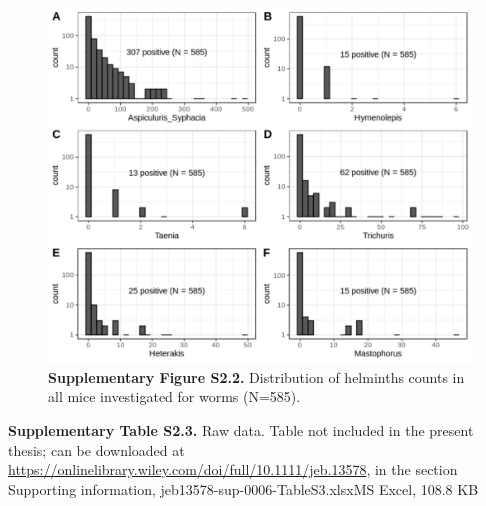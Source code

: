 \begin{figure}[H]
	\centering
	\includegraphics[width=\linewidth,height=\textheight,keepaspectratio]{images/2article1/SupplementaryFigureS2.pdf}
	\captionsetup{labelformat=empty}
	\caption{\textbf{Supplementary Figure S2.2.} Distribution of helminths counts in all mice investigated for worms (N=585).}
\end{figure}

\newpage

\textbf{Supplementary Table S2.3.} Raw data. Table not included in the present thesis; can be downloaded at \url{https://onlinelibrary.wiley.com/doi/full/10.1111/jeb.13578}, in the section Supporting information, jeb13578-sup-0006-TableS3.xlsxMS Excel, 108.8 KB

\newpage

